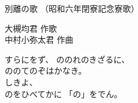\documentclass[10pt,b5j]{tarticle} %
\begin{document}
\begin{minipage}[c]{0.7\hsize} %
    \begin{center}
        {\LARGE
            別離の歌 %
        }
        {\small 
            （昭和六年閉寮記念寮歌） %
        }
    \end{center}
\end{minipage}
\begin{minipage}[c]{0.3\hsize} %
    \begin{flushright} %
        大槻均君 作歌\\中村小弥太君 作曲 %
    \end{flushright}
\end{minipage}

\vspace{1.5em} %
\newcommand{\linespace}{0.5em} %
\newcommand{\blocksize}{0.33\hsize} %
\newcommand{\itemmargin}{3em} %

\vspace{\linespace}
すらにをず、
ののれのきざるに、\\
ののてのぞはかなき。\\
しきよ、\\
のをひべてかに
「の」をでん。
\end{document}
